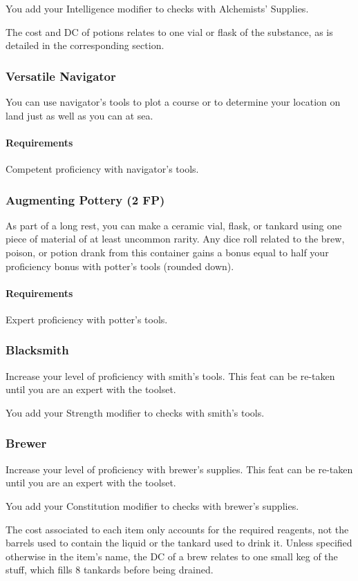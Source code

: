     You add your Intelligence modifier to checks with Alchemists' Supplies.

    The cost and DC of potions relates to one vial or flask of the substance, as is detailed in the corresponding section.
\subsubsection{Versatile Navigator} \label{feat::versatilenavigator}
    You can use navigator's tools to plot a course or to determine your location on land just as well as you can at sea.
    \paragraph{Requirements} Competent proficiency with navigator's tools.
\subsubsection{Augmenting Pottery (2 FP)} \label{feat::augmentingpottery}
    As part of a long rest, you can make a ceramic vial, flask, or tankard using one piece of material of at least uncommon rarity.
    Any dice roll related to the brew, poison, or potion drank from this container gains a bonus equal to half your proficiency bonus with potter's tools (rounded down).
    \paragraph{Requirements} Expert proficiency with potter's tools.
\subsubsection{Blacksmith} \label{feat::blacksmith}
    Increase your level of proficiency with smith's tools.
    This feat can be re-taken until you are an expert with the toolset.

    You add your Strength modifier to checks with smith's tools.
\subsubsection{Brewer} \label{feat::brewer}
    Increase your level of proficiency with brewer's supplies.
    This feat can be re-taken until you are an expert with the toolset.

    You add your Constitution modifier to checks with brewer's supplies.

    The cost associated to each item only accounts for the required reagents, not the barrels used to contain the liquid or the tankard used to drink it.
    Unless specified otherwise in the item's name, the DC of a brew relates to one small keg of the stuff, which fills 8 tankards before being drained.
